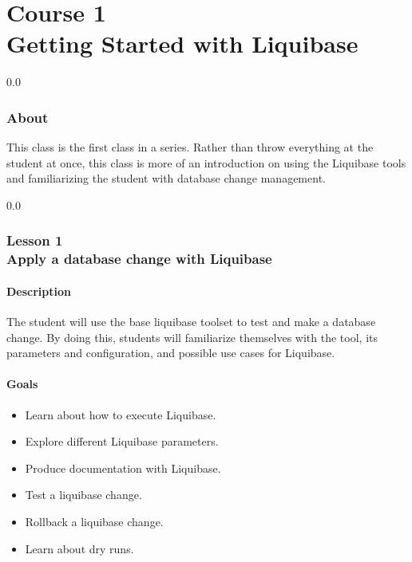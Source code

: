 \part*{Course 1\\
Getting Started with Liquibase
}

{\setlength{\baselineskip}%
  {0.0\baselineskip}
  \section*{\flushright About}
  \hrulefill \par}
This class is the first class in a series. Rather than throw
everything at the student at once, this class is more of an
introduction on using the Liquibase tools and familiarizing the
student with database change management.

{}
{\setlength{\baselineskip}%
  {0.0\baselineskip}
  \section*{\flushright Lesson 1\\
  Apply a database change with Liquibase}
  \hrulefill \par}

\subsection*{Description}
The student will use the base liquibase toolset to test and make a database
change. By doing this, students will familiarize themselves with the
tool, its parameters and configuration, and possible use cases for Liquibase.


\subsection*{Goals}
\begin{itemize}
  \item Learn about how to execute Liquibase.
  \item Explore different Liquibase parameters.
  \item Produce documentation with Liquibase.
  \item Test a liquibase change.
  \item Rollback a liquibase change.
  \item Learn about dry runs.
\end{itemize}

